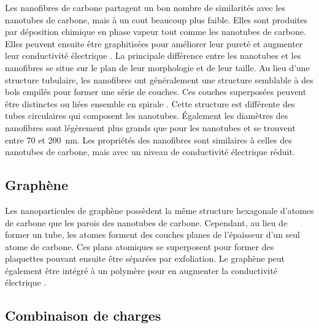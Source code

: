Les nanofibres de carbone partagent un bon nombre de similarités avec les nanotubes de carbone, mais à un cout beaucoup plus faible. 
Elles sont produites par déposition chimique en phase vapeur tout comme les nanotubes de carbone. 
Elles peuvent ensuite être graphitisées pour améliorer leur pureté et augmenter leur conductivité électrique \cite{Al-Saleh2009c}. 
La principale différence entre les nanotubes et les nanofibres se situe sur le plan de leur morphologie et de leur taille. 
Au lieu d'une structure tubulaire, les nanofibres ont généralement une structure semblable à des bols empilés pour former une série de couches. 
Ces couches superposées peuvent être distinctes ou liées ensemble en spirale \cite{Al-Saleh2009c}. 
Cette structure est différente des tubes circulaires qui composent les nanotubes. 
Également les diamètres des nanofibres sont légèrement plus grands que pour les nanotubes et se trouvent entre 70 et \SI{200}{\nano\metre}. 
Les propriétés des nanofibres sont similaires à celles des nanotubes de carbone, mais avec un niveau de conductivité électrique réduit. 

\subsection{Graphène}

Les nanoparticules de graphène possèdent la même structure hexagonale d'atomes de carbone que les parois des nanotubes de carbone. 
Cependant, au lieu de former un tube, les atomes forment des couches planes de l'épaisseur d'un seul atome de carbone. 
Ces plans atomiques se superposent pour former des plaquettes pouvant ensuite être séparées par exfoliation. 
Le graphène peut également être intégré à un polymère pour en augmenter la conductivité électrique \cite{Jin2013,Wu2012a,Dweiri2015}. 

\subsection{Combinaison de charges}

